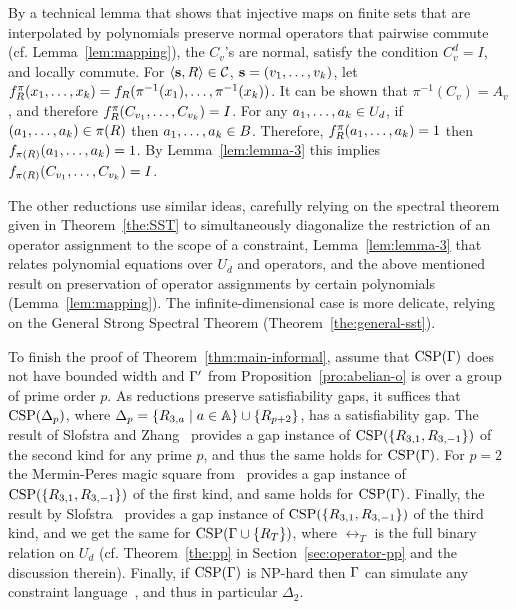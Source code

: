By a technical lemma that shows that injective maps on finite sets that are interpolated
by polynomials preserve normal operators that pairwise commute (cf.
Lemma~\ref{lem:mapping}), 
the $C_v$'s are normal, satisfy the condition $C_v^d=I$, and locally commute. For $\langle {\bf s},R \rangle\in{\mathcal C}$, ${\bf s}=(v _1,\ldots, v _{k})$, let $f^\pi_R(x _1,\ldots, x _{k})=f_R(\pi^{-1}(x_1),\ldots,\pi^{-1}(x_k))$. 
It can be shown that $\pi^{-1}(C_v)=A_v$, and therefore $f^\pi_R(C_{v_1},\ldots, C_{v_k})=I$. For any $a _1,\ldots, a _{k}\in U_d$, if $(a _1,\ldots, a _{k})\in\pi(R)$ then $a _1,\ldots, a _{k}\in B$. Therefore, $f^\pi_R(a _1,\ldots, a _{k})=1$ then $f_{\pi(R)}(a _1,\ldots, a _{k})=1$. By Lemma~\ref{lem:lemma-3} this implies $f_{\pi(R)}(C_{v_1},\ldots, C_{v_k})=I$.


The other reductions use similar ideas, carefully relying on the spectral
theorem given in Theorem~\ref{the:SST} to simultaneously diagonalize the
restriction of an operator assignment to the scope of a constraint,
Lemma~\ref{lem:lemma-3} that relates polynomial equations over $U_d$ and
operators, and the above mentioned result on
preservation of operator assignments by certain polynomials (Lemma~\ref{lem:mapping}).
%
The infinite-dimensional case is more delicate, relying on the General Strong
Spectral Theorem (Theorem~\ref{the:general-sst}).

\smallskip
To finish the proof of Theorem~\ref{thm:main-informal}, assume that
${\rm CSP}(\Gamma)$ does not have bounded width and $\Gamma'$ from
Proposition~\ref{pro:abelian-o} is over a group of prime order $p$. As reductions preserve satisfiability gaps, it suffices that
${\rm CSP}(\Delta_p)$, where $\Delta_p=\{R_{3,a}\mid a\in{\mathbb A}\}\cup\{R_{p+2}\}$, has a
satisfiability gap. The result of
Slofstra and Zhang~\cite{SZ24:personal} provides a gap instance of ${\rm CSP}(\{R_{3,1},R_{3,-1}\})$ of the 
second kind for any prime $p$, and thus the same holds for ${\rm CSP}(\Gamma)$.
For $p=2$ the Mermin-Peres magic square from~\cite{Mermin1990simple}
provides a gap instance of ${\rm CSP}(\{R_{3,1},R_{3,-1}\})$ of the first kind,
and same holds for ${\rm CSP}(\Gamma)$.
Finally, the result by Slofstra~\cite{Slofstra20:jams} provides a gap instance of
${\rm CSP}(\{R_{3,1},R_{3,-1}\})$ of the third kind, and we get the same for
${\rm CSP}(\Gamma\cup\{R_T\})$, where $\rel_T$ is the full binary relation on $U_d$ (cf.
Theorem~\ref{the:pp} in Section~\ref{sec:operator-pp} and the discussion
therein). Finally, if ${\rm CSP}(\Gamma)$ is NP-hard then $\Gamma$ can simulate any
constraint language~\cite{Bulatov05:classifying}, and thus in particular $\Delta_2$.


